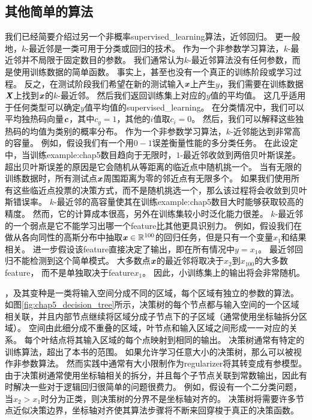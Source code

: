 \subsection{其他简单的算法}
\label{sec:other_simple_supervised_learning_algorithms}
我们已经简要介绍过另一个非概率\gls{supervised_learning}算法，近邻回归。
更一般地，$k$-最近邻是一类可用于分类或回归的技术。
作为一个非参数学习算法，$k$-最近邻并不局限于固定数目的参数。
我们通常认为$k$-最近邻算法没有任何参数，而是使用训练数据的简单函数。
事实上，甚至也没有一个真正的训练阶段或学习过程。
反之，在测试阶段我们希望在新的测试输入$\boldsymbol{\mathit{x}}$上产生$y$，我们需要在训练数据$\boldsymbol{\mathit{X}}$上找到$\boldsymbol{\mathit{x}}$的$k$-最近邻。
然后我们返回训练集上对应的$y$值的平均值。
这几乎适用于任何类型可以确定$y$值平均值的\gls{supervised_learning}。
在分类情况中，我们可以平均独热码向量$\boldsymbol{\mathit{c}}$，其中$c_y = 1$，其他的$i$值取$c_i=0$。
然后，我们可以解释这些独热码的均值为类别的概率分布。
作为一个非参数学习算法，$k$-近邻能达到非常高的容量。
例如，假设我们有一个用$0-1$误差衡量性能的多分类任务。
在此设定中，当训练\gls{example:chap5}数目趋向于无限时，$1$-最近邻收敛到两倍贝叶斯误差。
超出贝叶斯误差的原因是它会随机从等距离的临近点中随机挑一个。
当有无限的训练数据时，所有测试点$\boldsymbol{\mathit{x}}$周围距离为零的邻近点有无限多个。
如果我们使用所有这些临近点投票的决策方式，而不是随机挑选一个，那么该过程将会收敛到贝叶斯错误率。
$k$-最近邻的高容量使其在训练\gls{example:chap5}数目大时能够获取较高的精度。
然而，它的计算成本很高，另外在训练集较小时泛化能力很差。
$k$-最近邻的一个弱点是它不能学习出哪一个\gls{feature}比其他更具识别力。
例如，假设我们在做从各向同性的高斯分布中抽取$\boldsymbol{\mathit{x}}\in\mathbb{R}^{100}$的回归任务，但是只有一个变量$x_1$和结果相关。
进一步假设该\gls{feature}直接决定了输出，即在所有情况中$y=x_1$。
最近邻回归不能检测到这个简单模式。
大多数点$\boldsymbol{\mathit{x}}$的最近邻将取决于$x_2$到$x_{100}$的大多数\gls{feature}，
而不是单独取决于\gls{feature}$x_1$。
因此，小训练集上的输出将会非常随机。


，及其变种是一类将输入空间分成不同的区域，每个区域有独立的参数的算法\citep{Breiman84}。
如图\ref{fig:chap5_decision_tree}所示，决策树的每个节点都与输入空间的一个区域相关联，并且内部节点继续将区域分成子节点下的子区域（通常使用坐标轴拆分区域）。
空间由此细分成不重叠的区域，叶节点和输入区域之间形成一一对应的关系。
每个叶结点将其输入区域的每个点映射到相同的输出。
决策树通常有特定的训练算法，超出了本书的范围。
如果允许学习任意大小的决策树，那么可以被视作非参数算法。
然而实践中通常有大小限制作为\gls{regularizer}将其转变成有参模型。
由于决策树通常使用坐标轴相关的拆分，并且每个子节点关联到常数输出，因此有时解决一些对于逻辑回归很简单的问题很费力。
例如，假设有一个二分类问题，当$x_2>x_1$时分为正类，则决策树的分界不是坐标轴对齐的。
决策树将需要许多节点近似决策边界，坐标轴对齐使其算法步骤将不断来回穿梭于真正的决策函数。

